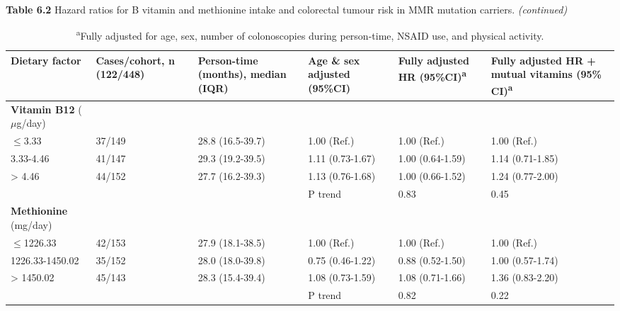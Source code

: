 \begin{sidewaystable}
\caption*{\textbf{Table 6.2} Hazard ratios for B vitamin and methionine intake and colorectal tumour risk in MMR mutation carriers. \emph{(continued)}}
\begin{adjustbox}{width=\textwidth}
\begin{tabular}{L{2.7cm}C{2.5cm}C{3.1cm}C{3.1cm}C{3.1cm}C{3.1cm}}
\hline
\parbox[c][1.7cm]{2.7cm}{\raggedright \textbf{Dietary factor}} &
\parbox[c][1.7cm]{2.5cm}{\centering \textbf{Cases/cohort, n (122/448)}} &
\parbox[c][1.7cm]{3.1cm}{\centering \textbf{Person-time (months), median (IQR)}} &
\parbox[c][1.7cm]{3.1cm}{\centering \textbf{Age \& sex adjusted (95\%CI)}} &
\parbox[c][1.7cm]{3.1cm}{\centering \textbf{Fully adjusted HR (95\%CI)}{\textsuperscript{a}}} &
\parbox[c][1.7cm]{3.1cm}{\centering \textbf{Fully adjusted HR + mutual vitamins (95\% CI)}{\textsuperscript{a}}}\\
\hline
{\textbf{Vitamin B12}}{ ($\mu$g/day)} & ~ & ~ & ~ & ~ & ~ \\
{\textrm{${\leq}$}}{3.33} & 37/149 & 28.8 (16.5-39.7) & 1.00 (Ref.) & 1.00 (Ref.) & 1.00 (Ref.)\\
3.33-4.46 & 41/147 & 29.3 (19.2-39.5) & 1.11 (0.73-1.67) & 1.00 (0.64-1.59) & 1.14 (0.71-1.85)\\
{\textgreater} 4.46 & 44/152 & 27.7 (16.2-39.3) & 1.13 (0.76-1.68) & 1.00 (0.66-1.52) & 1.24 (0.77-2.00)\\ ~ & ~ & ~ & P trend & 0.83 & 0.45\\

{\textbf{Methionine}}{ (mg/day)} & ~ & ~ & ~ & ~ & ~ \\
{\textrm{${\leq}$}}{1226.33} & 42/153 & 27.9 (18.1-38.5) & 1.00 (Ref.) & 1.00 (Ref.) & 1.00 (Ref.)\\
1226.33-1450.02 & 35/152 & 28.0 (18.0-39.8) & 0.75 (0.46-1.22) & 0.88 (0.52-1.50) & 1.00 (0.57-1.74)\\
{\textgreater} 1450.02 & 45/143 & 28.3 (15.4-39.4) & 1.08 (0.73-1.59) & 1.08 (0.71-1.66) & 1.36 (0.83-2.20)\\ ~ & ~ & ~ & P trend & 0.82 & 0.22\\
\hline
\end{tabular}
\end{adjustbox}
\caption*{\footnotesize{\textsuperscript{a}Fully adjusted for age, sex, number of colonoscopies during person-time, NSAID use, and physical activity.}}
\end{sidewaystable}


